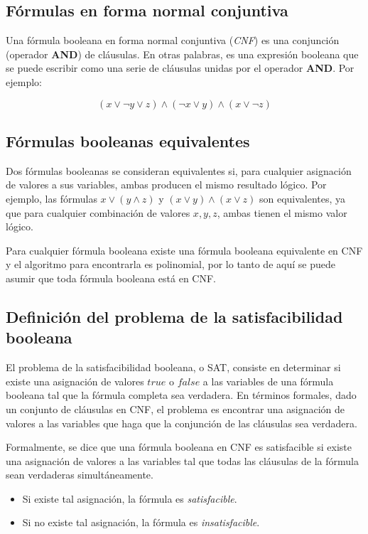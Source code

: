 \documentclass[12pt]{article}
\begin{document}
\subsection{Fórmulas en forma normal conjuntiva}

Una fórmula booleana en forma normal conjuntiva (\textit{CNF}) es una conjunción (operador \textbf{AND}) de cláusulas. En otras palabras, es una expresión booleana que se puede escribir como una serie de cláusulas unidas por el operador \textbf{AND}. Por ejemplo:

\[
      (x \vee \neg y \vee z) \wedge (\neg x \vee y) \wedge (x \vee \neg z)
\]

\subsection{Fórmulas booleanas equivalentes}

Dos fórmulas booleanas se consideran equivalentes si, para cualquier asignación de valores a sus variables, ambas producen el mismo resultado lógico. Por ejemplo, las fórmulas \( x \vee (y \wedge z) \) y \( (x \vee y) \wedge (x \vee z) \) son equivalentes, ya que para cualquier combinación de valores \( x, y, z \), ambas tienen el mismo valor lógico.

Para cualquier fórmula booleana existe una fórmula booleana equivalente en CNF y el algoritmo para encontrarla es polinomial, por lo tanto
de aquí se puede asumir que toda fórmula booleana está en CNF.

\subsection{Definición del problema de la satisfacibilidad booleana}

El problema de la satisfacibilidad booleana, o SAT, consiste en determinar si existe una asignación de valores \( true \) o \( false \) a las variables de una fórmula booleana tal que la fórmula completa sea verdadera. En términos formales, dado un conjunto de cláusulas en CNF, el problema es encontrar una asignación de valores a las variables que haga que la conjunción de las cláusulas sea verdadera.

Formalmente, se dice que una fórmula booleana en CNF es satisfacible si existe una asignación de valores a las variables tal que todas las cláusulas de la fórmula sean verdaderas simultáneamente.

\begin{itemize}
      \item Si existe tal asignación, la fórmula es \textit{satisfacible}.
      \item Si no existe tal asignación, la fórmula es \textit{insatisfacible}.
\end{itemize}
\end{document}
